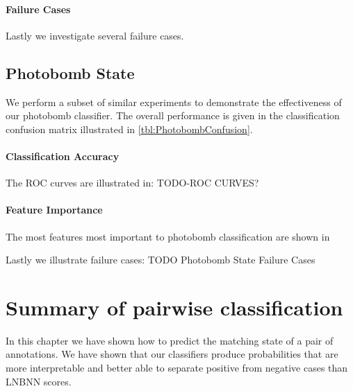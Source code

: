         \MatchWordCloud{}
        \ImportantMatchFeat{}

        \paragraph{Failure Cases}
        Lastly we investigate several failure cases.

        \PairFailPI{}

        \PairFailPN{}


    \subsection{Photobomb State}
        We perform a subset of similar experiments to demonstrate the effectiveness of
        our photobomb classifier.
        The overall performance is given in the classification confusion matrix
        illustrated in \cref{tbl:PhotobombConfusion}.

        \PhotobombConfusion


        \paragraph{Classification Accuracy}
        The ROC curves are illustrated in: TODO-ROC CURVES?

        \paragraph{Feature Importance}
        The most features most important to photobomb classification are shown in

        \ImportantPBFeat{}

        Lastly we illustrate failure cases: TODO Photobomb State Failure Cases


\section{Summary of pairwise classification}

    In this chapter we have shown how to predict the matching state of a pair of annotations. 
    We have shown that our classifiers produce probabilities that are more
    interpretable and better able to separate positive from negative cases than
    LNBNN scores. 
